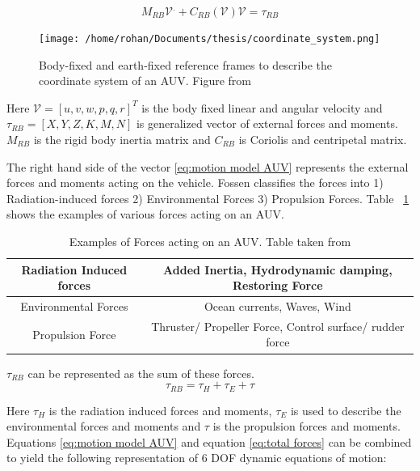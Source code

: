 \documentclass[12pt]{dalcsthesis}
\begin{document}
\begin{equation}
\label{eq:motion model AUV}
M_{RB}\mathcal{{V}}^{.}+C_{RB}(\mathcal{V})\mathcal{V}=\tau_{RB}
\end{equation}
\begin{figure}
  \centering
     {\texttt{[image: /home/rohan/Documents/thesis/coordinate\_system.png]}}
  \caption{\label{fig-Coordinate System} Body-fixed and earth-fixed reference frames to describe the coordinate system of an AUV. Figure from \cite{Thor}
}
\end{figure}
Here $\mathcal{V}=[u,v,w,p,q,r]^{T}$ is the body fixed linear and angular velocity and $\tau_{RB}=[X,Y,Z,K,M,N]$ is generalized vector of external forces and moments. $M_{RB}$ is the rigid body inertia matrix and $C_{RB}$ is Coriolis and centripetal matrix. 

The right hand side of the vector \ref{eq:motion model AUV} represents the external forces and moments acting on the vehicle. Fossen \cite{Thor} classifies the forces into 1) Radiation-induced forces 2) Environmental Forces 3) Propulsion Forces. Table ~\ref{forces auv examples} shows the examples of various forces acting on an AUV.

\begin{table}[tbh]
\centering
\begin{tabular}{|c|c|}
\hline 
Radiation Induced forces & Added Inertia, Hydrodynamic damping, Restoring Force \\ 
\hline 
Environmental Forces & Ocean currents, Waves, Wind \\ 
\hline 
Propulsion Force & Thruster/ Propeller Force, Control surface/ rudder force \\ 
\hline 
\end{tabular} 
\caption{\label{forces auv examples}Examples of Forces acting on an AUV. Table taken from \cite{Thor}}
\end{table}


$\tau_{RB}$ can be represented as the sum of these forces.
\begin{equation}
\label{eq:total forces}
 \tau_{RB} = \tau_{H} + \tau_{E} + \tau 
\end{equation}

Here $\tau_{H}$ is the radiation induced forces and moments, $\tau_{E}$ is used to describe the environmental forces and moments and $\tau$ is the propulsion forces and moments. Equations \ref{eq:motion model AUV} and equation \ref{eq:total forces} can be combined to yield the following representation of 6 DOF dynamic equations of motion:
 
\end{document}
